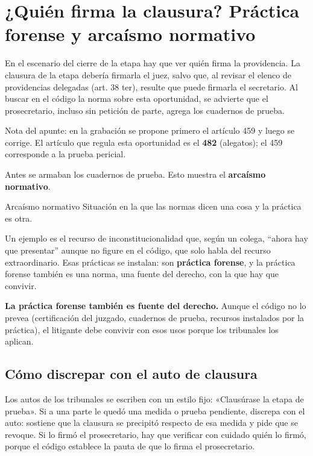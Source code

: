\documentclass[12pt,oneside]{book}
\begin{document}
\section{¿Quién firma la clausura? Práctica forense y arcaísmo normativo}

En el escenario del cierre de la etapa hay que ver quién firma la providencia. La clausura de la etapa debería firmarla el juez, salvo que, al revisar el elenco de providencias delegadas (art. 38 ter), resulte que puede firmarla el secretario. Al buscar en el código la norma sobre esta oportunidad, se advierte que el prosecretario, incluso sin petición de parte, agrega los cuadernos de prueba.

\begin{note}
Nota del apunte: en la grabación se propone primero el artículo 459 y luego se corrige. El artículo que regula esta oportunidad es el \textbf{482} (alegatos); el 459 corresponde a la prueba pericial.
\end{note}

Antes se armaban los cuadernos de prueba. Esto muestra el \textbf{arcaísmo normativo}.

\begin{definition}{Arcaísmo normativo}
Situación en la que las normas dicen una cosa y la práctica es otra.
\end{definition}

Un ejemplo es el recurso de inconstitucionalidad que, según un colega, ``ahora hay que presentar'' aunque no figure en el código, que solo habla del recurso extraordinario. Esas prácticas se instalan: son \textbf{práctica forense}, y la práctica forense también es una norma, una fuente del derecho, con la que hay que convivir.

\begin{important}
\textbf{La práctica forense también es fuente del derecho.} Aunque el código no lo prevea (certificación del juzgado, cuadernos de prueba, recursos instalados por la práctica), el litigante debe convivir con esos usos porque los tribunales los aplican.
\end{important}

\subsection{Cómo discrepar con el auto de clausura}

Los autos de los tribunales se escriben con un estilo fijo: «Clausúrase la etapa de prueba». Si a una parte le quedó una medida o prueba pendiente, discrepa con el auto: sostiene que la clausura se precipitó respecto de esa medida y pide que se revoque. Si lo firmó el prosecretario, hay que verificar con cuidado quién lo firmó, porque el código establece la pauta de que lo firma el prosecretario.
\end{document}
